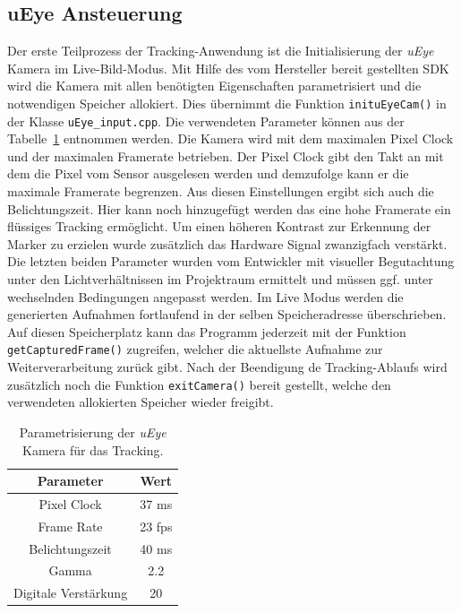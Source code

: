 \subsection{uEye Ansteuerung}\label{sec:UEyeSteu}
Der erste Teilprozess der Tracking-Anwendung ist die Initialisierung der \textit{uEye} Kamera im Live-Bild-Modus. Mit Hilfe des vom Hersteller bereit gestellten SDK wird die Kamera mit allen benötigten Eigenschaften parametrisiert und die notwendigen Speicher allokiert. Dies übernimmt die Funktion \texttt{init\-uEyeCam()} in der Klasse \texttt{uEye\_input.cpp}. Die verwendeten Parameter können aus der Tabelle~\ref{tab:UeyeParam} entnommen werden. Die Kamera wird mit dem maximalen Pixel Clock und der maximalen Framerate betrieben. Der Pixel Clock gibt den Takt an mit dem die Pixel vom Sensor ausgelesen werden und demzufolge kann er die maximale Framerate begrenzen. Aus diesen Einstellungen ergibt sich auch die Belichtungszeit.
Hier kann noch hinzugefügt werden das eine hohe Framerate ein flüssiges Tracking ermöglicht.
Um einen höheren Kontrast zur Erkennung der Marker zu erzielen wurde zusätzlich das Hardware Signal zwanzigfach verstärkt. Die letzten beiden Parameter wurden vom Entwickler mit visueller Begutachtung unter den Lichtverhältnissen im Projektraum ermittelt und müssen ggf. unter wechselnden Bedingungen angepasst werden.  
Im Live Modus werden die generierten Aufnahmen fortlaufend in der selben Speicheradresse überschrieben. Auf diesen Speicherplatz kann das Programm jederzeit mit der Funktion \texttt{get\-Captured\-Frame()} zugreifen, welcher die aktuellste Aufnahme zur Weiterverarbeitung zurück gibt. Nach der Beendigung de Tracking-Ablaufs wird zusätzlich noch die Funktion \texttt{exit\-Camera()} bereit gestellt, welche den verwendeten allokierten Speicher wieder freigibt.

\begin{table}
	\centering
	\begin{tabular}{|c|c|}
		\hline
		\Absatzbox{}
		\textbf{Parameter}& \textbf{Wert} \\
		\hline
		Pixel Clock & 37 ms \\
		\hline
		Frame Rate & 23 fps \\
		\hline 
		Belichtungszeit & 40 ms\\
		\hline
		Gamma & 2.2 \\
		\hline
		Digitale Verstärkung & 20 \\
		\hline
	\end{tabular}
	\caption{Parametrisierung der \textit{uEye} Kamera für das Tracking.}
	\label{tab:UeyeParam}
\end{table}

